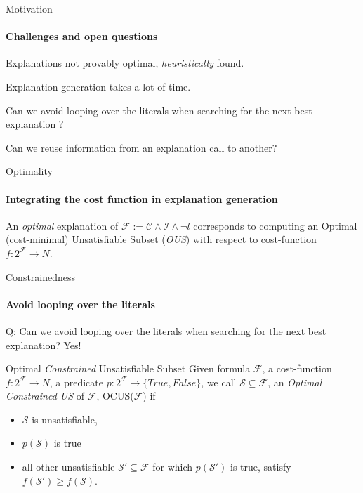 \documentclass[handout]{beamer}
\newcommand\m[1]{\ensuremath{\mathcal{#1}}\xspace}
\begin{document}
	\begin{frame}{Motivation}
		\framesubtitle{Challenges and open questions}

		\begin{description}[font=\color{vuborange}\itshape]
			\item[Optimality] Explanations not provably optimal, \emph{heuristically} found. \pause
			\item[Efficiency] Explanation generation takes a lot of time. \pause
			\item[Constrainedness] Can we avoid looping over the literals when searching for the next best explanation ?
			\item[Incrementality] Can we reuse information from an explanation call to another? \pause
		\end{description}
	\end{frame}

	\begin{frame}{Optimality}
	\framesubtitle{Integrating the cost function in explanation generation}
	\begin{definition}
		An \emph{\color{vuborange}optimal} explanation of $\m{F} := \m{C} \wedge \m{I} \wedge \lnot l$ corresponds to computing an Optimal (cost-minimal) Unsatisfiable Subset (\emph{\color{vuborange}OUS}) with respect to cost-function $f: 2^{\m{F}} \rightarrow N$.
	\end{definition}
	
		\end{frame}

	\begin{frame}{Constrainedness}
	\framesubtitle{Avoid looping over the literals}

	Q: Can we avoid looping over the literals when searching for the next best explanation?\pause  
	Yes!\pause
	
	\begin{block}{Optimal \emph{Constrained} Unsatisfiable Subset}
		Given formula $\m{F}$, a cost-function $f: 2^{\m{F}} \rightarrow N$, a predicate $p: 2^{\m{F}} \rightarrow \{True, False\}$, we call $\m{S} \subseteq \m{F}$, an \emph{\color{vuborange}Optimal Constrained US} of $\m{F}$, OCUS($\m{F}$) if 
		\begin{itemize}
			\item $\m{S}$ is unsatisfiable,
			\item $p(\m{S})$ is true
			\item all other unsatisfiable $\m{S}'\subseteq \m{F}$ for which $p(\m{S}')$ is true, satisfy $f(\m{S}') \geq f (\m{S})$.
		\end{itemize}
	\end{block}
	
	\end{frame}
\end{document}
